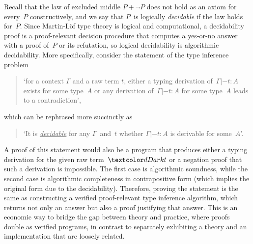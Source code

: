 Recall that the law of excluded middle $P + \neg P$ does not hold as an axiom for every~$P$ constructively, and we say that $P$~is logically \emph{decidable} if the law holds for~$P$.
Since Martin-L\"of type theory is logical and computational, a decidability proof is a proof-relevant decision procedure that computes a yes-or-no answer with a proof of~$P$ or its refutation, so logical decidability is algorithmic decidability.
More specifically, consider the statement of the type inference problem
\begin{quote}
  `for a context $\Gamma$ and a raw term $t$, either a typing derivation of\, $\Gamma |- t : A$ exists for some type~$A$ or any derivation of\, $\Gamma |- t : A$ for some type~$A$ leads to a contradiction',
\end{quote}
which can be rephrased more succinctly as
\begin{quote}
  `It is \underline{\emph{decidable}} for any $\Gamma$~and~$t$ whether $\Gamma |- t : A$ is derivable for some~$A$'.
\end{quote}
A proof of this statement would also be a program that produces either a typing derivation for the given raw term~$\isTerm{t}$ or a negation proof that such a derivation is impossible.
The first case is algorithmic soundness, while the second case is algorithmic completeness in contrapositive form (which implies the original form due to the decidability).
Therefore, proving the statement is the same as constructing a verified proof-relevant type inference algorithm, which returns not only an answer but also a proof justifying that answer.
This is an economic way to bridge the gap between theory and practice, where proofs double as verified programs, in contrast to separately exhibiting a theory and an implementation that are loosely related.


